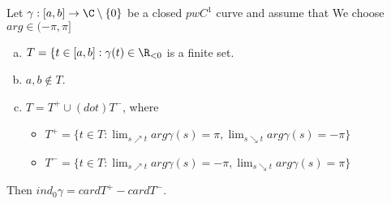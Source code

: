 \begin{remark}
  Let $\gamma:[a,b]\to \C\setminus\{0\}$ be a closed $pwC^1$ curve and assume that
  \newline We choose $arg\in(-\pi , \pi]$
    \begin{enumerate}[(a)]
      \item $T=\{t\in [a,b]: \gamma(t)\in \R_{<0}$ is a finite set.
      \item $a,b \notin T$.
      \item $T=T^+ \cup(dot) T^-$, where
        \begin{itemize}
          \item $T^+=\{t\in T: \lim_{s\nearrow t}arg \gamma(s)=\pi, \lim_{s\searrow t}arg \gamma (s)=-\pi\}$
          \item $T^-=\{t\in T: \lim_{s\nearrow t}arg \gamma(s)=-\pi, \lim_{s\searrow t}arg \gamma (s)=\pi\}$
        \end{itemize}
    \end{enumerate}
    Then $ind_0 \gamma=card T^+-cardT^-$.
\end{remark}
